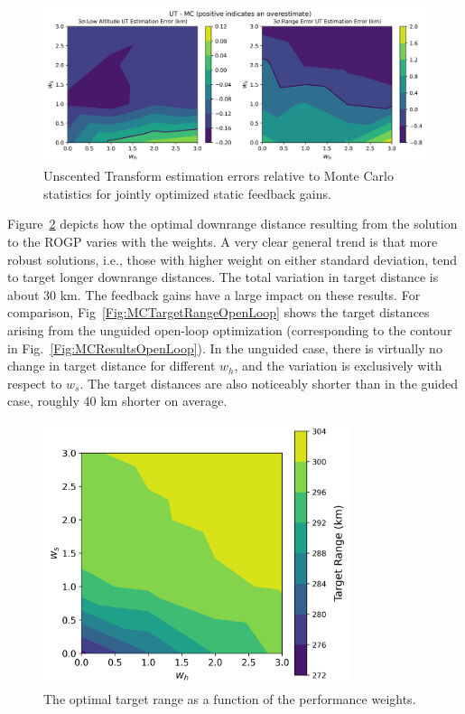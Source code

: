 \begin{figure}[h!]
	\centering
	\includegraphics[width=1\textwidth]{Images/Reoptimized_WeightSweepError}
	\caption{Unscented Transform estimation errors relative to Monte Carlo statistics for jointly optimized static feedback gains.}
	\label{Fig:MCErrorsOptGain}
\end{figure}
Figure~\ref{Fig:MCTargetRange} depicts how the optimal downrange distance resulting from the solution to the ROGP varies with the weights. A very clear general trend is that more robust solutions, i.e., those with higher weight on either standard deviation, tend to target longer downrange distances. The total variation in target distance is about 30 km. The feedback gains have a large impact on these results. For comparison, Fig~\ref{Fig:MCTargetRangeOpenLoop} shows the target distances arising from the unguided open-loop optimization (corresponding to the contour in Fig.~\ref{Fig:MCResultsOpenLoop}). In the unguided case, there is virtually no change in target distance for different $w_h$, and the variation is exclusively with respect to $w_s$. The target distances are also noticeably shorter than in the guided case, roughly 40 km shorter on average.  
\begin{figure}[h!]
	\centering
	\includegraphics[width=0.8\textwidth]{Images/MSL_TargetRange}
	\caption{The optimal target range as a function of the performance weights.}
	\label{Fig:MCTargetRange}
\end{figure}
